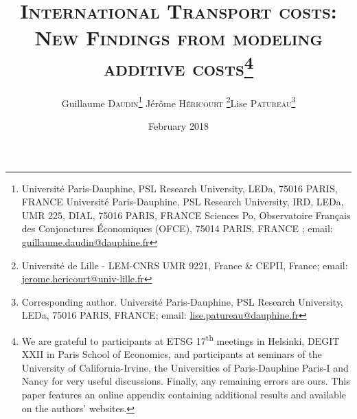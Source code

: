 \documentclass[a4paper,11pt]{article}
\begin{document}
\title{\textsc{International Transport costs:\\New Findings from modeling additive costs}\thanks{We are grateful to participants at ETSG 17\textsuperscript{th} meetings in Helsinki, DEGIT XXII in Paris School of Economics, and participants at seminars of the University of California-Irvine, the Universities of Paris-Dauphine Paris-I and Nancy for very useful discussions. Finally, any remaining errors are ours. This paper features an online appendix containing additional results and available on the authors' websites.}}

\author{Guillaume \textsc{Daudin}\thanks{%
Universit\'{e} Paris-Dauphine, PSL Research University, LEDa, 75016 PARIS, FRANCE \newline
Universit\'{e} Paris-Dauphine, PSL Research University, IRD, LEDa, UMR 225, DIAL, 75016 PARIS, FRANCE \newline
Sciences Po, Observatoire Fran\c{c}ais des Conjonctures \'{E}conomiques (OFCE), 75014 PARIS, FRANCE \newline
; email: \url{guillaume.daudin@dauphine.fr}}  \qquad J\'{e}r\^{o}me \textsc{H\'{e}ricourt} \thanks{Universit\'{e} de Lille - LEM-CNRS UMR 9221, France \& CEPII, France; email: \url{jerome.hericourt@univ-lille.fr}}\qquad Lise \textsc{Patureau}\thanks{Corresponding author. Universit\'{e} Paris-Dauphine, PSL Research University, LEDa, 75016 PARIS, FRANCE;  email: \url{lise.patureau@dauphine.fr} } }





\date{February 2018}
 \maketitle
\bigskip
\end{document}
